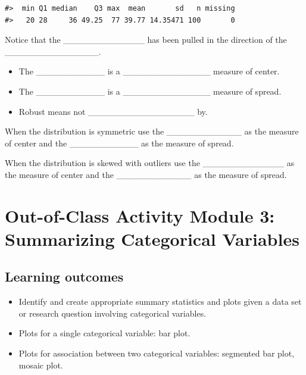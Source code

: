 \documentclass[
]{report}
\begin{document}
\begin{verbatim}
#>  min Q1 median    Q3 max  mean       sd   n missing
#>   20 28     36 49.25  77 39.77 14.35471 100       0
\end{verbatim}


Notice that the \_\_\_\_\_\_\_\_\_\_\_\_\_ has been pulled in the direction of the \_\_\_\_\_\_\_\_\_\_\_\_\_\_\_.

\begin{itemize}
\item
  The \_\_\_\_\_\_\_\_\_\_\_ is a \_\_\_\_\_\_\_\_\_\_\_\_\_\_ measure of center.
\item
  The \_\_\_\_\_\_\_\_\_\_\_ is a \_\_\_\_\_\_\_\_\_\_\_\_\_\_ measure of spread.
\item
  Robust means not \_\_\_\_\_\_\_\_\_\_\_\_\_\_\_\_\_ by.
\end{itemize}

When the distribution is symmetric use the \_\_\_\_\_\_\_\_\_\_\_\_ as the measure of center and the \_\_\_\_\_\_\_\_\_\_\_ as the measure of spread.

When the distribution is skewed with outliers use the \_\_\_\_\_\_\_\_\_\_\_\_\_ as the measure of center and the \_\_\_\_\_\_\_\_\_\_\_\_ as the measure of spread.


\newpage

\hypertarget{out-of-class-activity-module-3-summarizing-categorical-variables}{%
\section{Out-of-Class Activity Module 3: Summarizing Categorical Variables}\label{out-of-class-activity-module-3-summarizing-categorical-variables}}


\hypertarget{learning-outcomes-4}{%
\subsection{Learning outcomes}\label{learning-outcomes-4}}

\begin{itemize}
\item
  Identify and create appropriate summary statistics and plots given a data set or research question involving categorical variables.
\item
  Plots for a single categorical variable: bar plot.
\item
  Plots for association between two categorical variables:
  segmented bar plot, mosaic plot.
\end{itemize}
\end{document}
